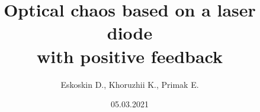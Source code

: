 \documentclass[]{beamer}
\title[Optical chaos]{Optical chaos based on a laser diode \\
with positive  feedback}
\author{
Eskoskin D., 
Khoruzhii K., Primak E.}
\institute[MIPT]
\begin{document}
\date{05.03.2021}
\maketitle















\end{document}
